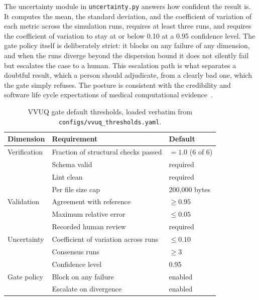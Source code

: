 The
uncertainty module in \texttt{uncertainty.py} answers how confident the result
is. It computes the mean, the standard deviation, and the coefficient of
variation of each metric across the simulation runs, requires at least three
runs, and requires the coefficient of variation to stay at or below 0.10 at a
0.95 confidence level. The gate policy itself is deliberately strict: it blocks
on any failure of any dimension, and when the runs diverge beyond the dispersion
bound it does not silently fail but escalates the case to a human. This
escalation path is what separates a doubtful result, which a person should
adjudicate, from a clearly bad one, which the gate simply refuses. The posture is
consistent with the credibility and software life cycle expectations of medical
computational evidence~\cite{iec62304, iche6r3}.

\begin{table}[H]
\caption{VVUQ gate default thresholds, loaded verbatim from \texttt{configs/vvuq\_thresholds.yaml}.}
\label{tab:methods_thresholds}
\centering
\begin{tabularx}{\textwidth}{L{4.0cm} >{\raggedright\arraybackslash}X L{3.3cm}}
\toprule
\textbf{Dimension} & \textbf{Requirement} & \textbf{Default} \\
\midrule
  Verification & Fraction of structural checks passed & $= 1.0$ (6 of 6) \\
               & Schema valid                         & required \\
               & Lint clean                           & required \\
               & Per file size cap                    & 200{,}000 bytes \\
  \addlinespace
  Validation   & Agreement with reference             & $\geq 0.95$ \\
               & Maximum relative error               & $\leq 0.05$ \\
               & Recorded human review                & required \\
  \addlinespace
  Uncertainty  & Coefficient of variation across runs & $\leq 0.10$ \\
               & Consensus runs                       & $\geq 3$ \\
               & Confidence level                     & 0.95 \\
  \addlinespace
  Gate policy  & Block on any failure                 & enabled \\
               & Escalate on divergence               & enabled \\
\bottomrule
\end{tabularx}
\end{table}



